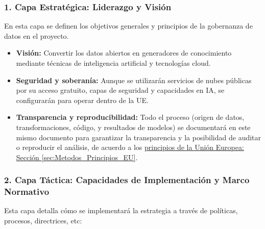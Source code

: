 \subsubsection*{1. Capa Estratégica: Liderazgo y Visión}

En esta capa se definen los objetivos generales y principios de la gobernanza de datos en el proyecto.

\begin{itemize}
	\item \textbf{Visión:} Convertir los datos abiertos en generadores de conocimiento mediante técnicas de inteligencia artificial y tecnologías cloud.
	
	\item \textbf{Seguridad y soberanía:} Aunque se utilizarán servicios de nubes públicas por su acceso gratuito, capas de seguridad y capacidades en IA, se configurarán para operar dentro de la UE.
	
	\item \textbf{Transparencia y reproducibilidad:} Todo el proceso (origen de datos, transformaciones, código, y resultados de modelos) se documentará en este mismo documento para garantizar la transparencia y la posibilidad de auditar o reproducir el análisis, de acuerdo a los \hyperref[sec:Metodos_Principios_EU]{principios de la Unión Europea: Sección \ref*{sec:Metodos_Principios_EU}}.
\end{itemize}


\subsubsection*{2. Capa Táctica: Capacidades de Implementación y Marco Normativo}

Esta capa detalla cómo se implementará la estrategia a través de políticas, procesos, directrices, etc:

